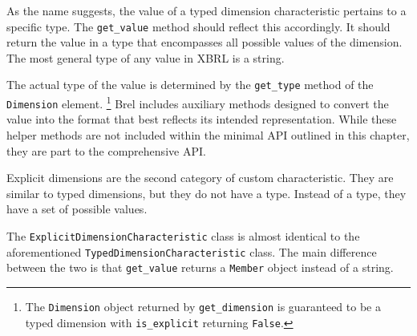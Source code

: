 As the name suggests, the value of a typed dimension characteristic pertains to a specific type.
The \texttt{get\_value} method should reflect this accordingly.
It should return the value in a type that encompasses all possible values of the dimension.
The most general type of any value in XBRL is a string.

The actual type of the value is determined by the \texttt{get\_type} method of the \texttt{Dimension} element.
\footnote{The \texttt{Dimension} object returned by \texttt{get\_dimension} is guaranteed to be a typed dimension with \texttt{is\_explicit} returning \texttt{False}.}
Brel includes auxiliary methods designed to convert the value into the format that best reflects its intended representation.
While these helper methods are not included within the minimal API outlined in this chapter, they are part to the comprehensive API.

Explicit dimensions are the second category of custom characteristic.
They are similar to typed dimensions, but they do not have a type.
Instead of a type, they have a set of possible values.

The \texttt{ExplicitDimensionCharacteristic} class is almost identical to the aforementioned \texttt{TypedDimensionCharacteristic} class.
The main difference between the two is that \texttt{get\_value} returns a \texttt{Member} object instead of a string.

